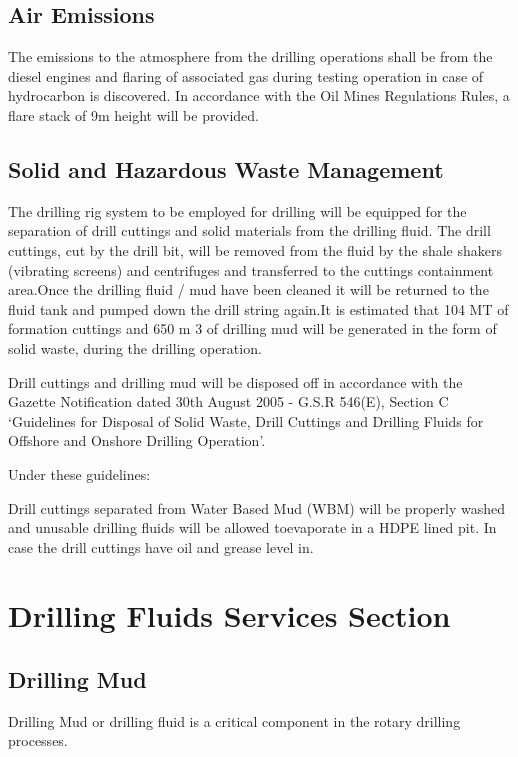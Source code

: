 \documentclass[11pt,a4paper]{article}
\begin{document}
\subsection{\textbf{Air Emissions}}

The emissions to the atmosphere from the drilling operations shall be from the diesel engines and flaring of associated gas during testing operation in case of hydrocarbon is discovered. In accordance with the Oil Mines Regulations Rules, a flare stack of 9m height will be provided.

\subsection{\textbf{Solid and Hazardous Waste Management}}

The drilling rig system to be employed for drilling will be equipped for the separation of drill cuttings and solid materials from the drilling fluid. The drill cuttings, cut by the drill bit, will be removed from the fluid by the shale shakers (vibrating screens) and centrifuges and transferred to the cuttings containment area.Once the drilling fluid / mud have been cleaned it will be returned to the fluid tank and pumped down the drill string again.It is estimated that 104 MT of formation cuttings and 650 m 3 of drilling mud will be generated in the form of solid waste, during the drilling operation.

Drill cuttings and drilling mud will be disposed off in accordance with the Gazette Notification dated 30th August 2005 - G.S.R 546(E), Section C ‘Guidelines for Disposal of Solid Waste, Drill Cuttings and Drilling Fluids for Offshore and Onshore Drilling
Operation’. 

Under these guidelines:

Drill cuttings separated from Water Based Mud (WBM) will be properly washed and unusable drilling fluids will be allowed toevaporate in a HDPE lined pit. In case the drill cuttings have oil and grease level in.

\section{\textbf{Drilling Fluids Services Section}}

\subsection{\textbf{Drilling Mud}}
	
Drilling Mud or drilling fluid is a critical component in the rotary drilling processes.
\end{document}
